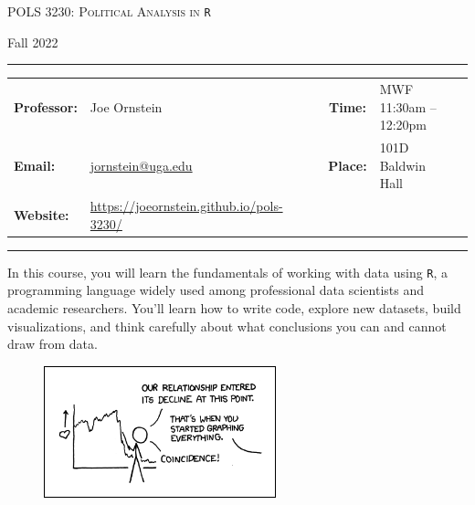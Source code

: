 \documentclass[11pt, letterpaper]{article}
\begin{document}
\begin{center}
{\Large \textsc{POLS 3230: Political Analysis in \texttt{R}}}
\end{center}
\begin{center}
{\large Fall 2022}
\end{center}

\begin{center}
\rule{6.5in}{0.4pt}
\begin{minipage}[t]{.96\textwidth}
\begin{tabular}{llcccll}
\textbf{Professor:} & Joe Ornstein & &  & \textbf{Time:} & MWF 11:30am -- 12:20pm \\
\textbf{Email:} &  \href{mailto:jornstein@uga.edu}{jornstein@uga.edu} & & & \textbf{Place:} & 101D Baldwin Hall\\
\textbf{Website:} & \href{https://joeornstein.github.io/pols-3230/}{https://joeornstein.github.io/pols-3230/} & & & &
\end{tabular}
\end{minipage}
\rule{6.5in}{0.4pt}
\end{center}
\vspace{.15cm}
\setlength{\unitlength}{1in}
\renewcommand{\arraystretch}{2}

\noindent In this course, you will learn the fundamentals of working with data using \texttt{R}, a programming language widely used among professional data scientists and academic researchers. You'll learn how to write code, explore new datasets, build visualizations, and think carefully about what conclusions you can and cannot draw from data.

\begin{figure}[h]
	\centering
	\href{https://xkcd.com/523/}{\includegraphics[width=0.6\textwidth]{img/decline.png}}
\end{figure}

\end{document}
